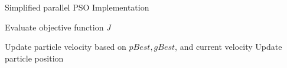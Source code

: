 \begin{algorithm}
    \caption{Simplified parallel PSO Implementation}
    \begin{algorithmic}
    \STATE Evaluate objective function $J$
    \hspace{17em}

    \ENDFOR
    \STATE Update particle velocity based on $pBest, gBest$, and current velocity
    \STATE Update particle position
    \ENDFOR
    \end{algorithmic}
\end{algorithm}

\newpage
